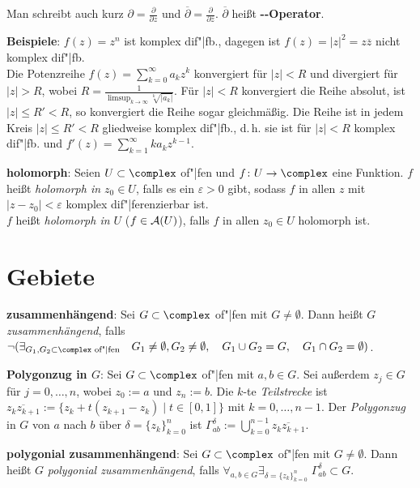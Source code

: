 Man schreibt auch kurz
$\partial = \frac{\partial}{\partial z}$ und
$\overline{\partial} = \frac{\partial}{\partial \overline{z}}$.
$\overline{\partial}$ heißt
\textbf{--Operator}.

\linie

\textbf{Beispiele}:
$f(z) = z^n$ ist komplex dif"|fb.,
dagegen ist $f(z) = |z|^2 = z \overline{z}$ nicht komplex dif"|fb.\\
Die Potenzreihe $f(z) = \sum_{k=0}^\infty a_k z^k$ konvergiert für
$|z| < R$ und divergiert für $|z| > R$, wobei
$R = \frac{1}{\limsup_{k \to \infty} \sqrt[k]{|a_k|}}$.
Für $|z| < R$ konvergiert die Reihe absolut, ist $|z| \le R' < R$,
so konvergiert die Reihe sogar gleichmäßig.
Die Reihe ist in jedem Kreis $|z| \le R' < R$ gliedweise komplex dif"|fb.,
d.\,h. sie ist für $|z| < R$ komplex dif"|fb. und
$f'(z) = \sum_{k=1}^\infty k a_k z^{k-1}$.

\linie

\textbf{holomorph}:
Seien $U \subset \complex$ of"|fen und $f\colon U \rightarrow \complex$
eine Funktion.
$f$ heißt \emph{holomorph in $z_0 \in U$}, falls es ein $\varepsilon > 0$ gibt,
sodass $f$ in allen $z$ mit $|z - z_0| < \varepsilon$ komplex dif"|ferenzierbar
ist.\\
$f$ heißt \emph{holomorph in $U$} ($f \in \mathcal{A}(U)$), falls
$f$ in allen $z_0 \in U$ holomorph ist.

\section{%
    Gebiete%
}

\textbf{zusammenhängend}:
Sei $G \subset \complex$ of"|fen mit $G \not= \emptyset$.
Dann heißt $G$ \emph{zusammenhängend}, falls\\
$\lnot(\exists_{G_1, G_2 \subset \complex \text{ of"|fen}}\quad
G_1 \not= \emptyset, G_2 \not= \emptyset,\quad
G_1 \cup G_2 = G,\quad
G_1 \cap G_2 = \emptyset)$.

\linie

\textbf{Polygonzug in $G$}:
Sei $G \subset \complex$ of"|fen mit $a, b \in G$.
Sei außerdem $z_j \in G$ für $j = 0, \dotsc, n$,
wobei $z_0 := a$ und $z_n := b$.
Die $k$-te \emph{Teilstrecke} ist $\overline{z_k z_{k+1}} :=
\{z_k + t(z_{k+1} - z_k) \;|\; t \in [0,1]\}$ mit $k = 0, \dotsc, n - 1$.
Der \emph{Polygonzug} in $G$ von $a$ nach $b$ über $\delta = \{z_k\}_{k=0}^n$
ist $\Gamma_{ab}^\delta := \bigcup_{k=0}^{n-1} \overline{z_k z_{k+1}}$.

\textbf{polygonial zusammenhängend}:
Sei $G \subset \complex$ of"|fen mit $G \not= \emptyset$.
Dann heißt $G$ \emph{polygonial zusammenhängend}, falls
$\forall_{a, b \in G} \exists_{\delta = \{z_k\}_{k=0}^n}\;
\Gamma_{ab}^\delta \subset G$.

